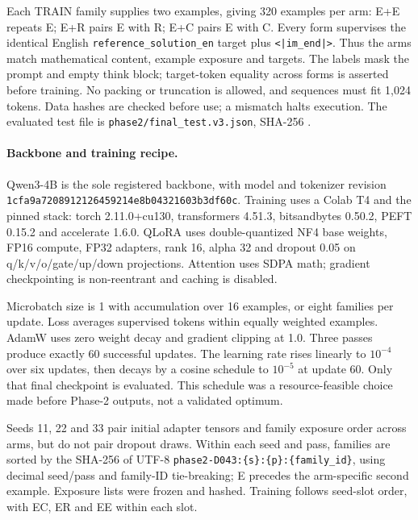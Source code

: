 Each TRAIN family supplies two examples, giving 320 examples per arm: E+E repeats E; E+R pairs E with R; E+C pairs E with C. Every form supervises the identical English \texttt{reference\_solution\_en} target plus \texttt{<|im\_end|>}. Thus the arms match mathematical content, example exposure and targets. The labels mask the prompt and empty think block; target-token equality across forms is asserted before training. No packing or truncation is allowed, and sequences must fit 1,024 tokens. Data hashes are checked before use; a mismatch halts execution. The evaluated test file is \nolinkurl{phase2/final_test.v3.json}, SHA-256 .

\paragraph{Backbone and training recipe.}
Qwen3-4B is the sole registered backbone, with model and tokenizer revision \texttt{1cfa9a7208912126459214e8b04321603b3df60c}. Training uses a Colab T4 and the pinned stack: torch 2.11.0+cu130, transformers 4.51.3, bitsandbytes 0.50.2, PEFT 0.15.2 and accelerate 1.6.0. QLoRA uses double-quantized NF4 base weights, FP16 compute, FP32 adapters, rank 16, alpha 32 and dropout 0.05 on q/k/v/o/gate/up/down projections. Attention uses SDPA math; gradient checkpointing is non-reentrant and caching is disabled.

Microbatch size is 1 with accumulation over 16 examples, or eight families per update. Loss averages supervised tokens within equally weighted examples. AdamW uses zero weight decay and gradient clipping at 1.0. Three passes produce exactly 60 successful updates. The learning rate rises linearly to $10^{-4}$ over six updates, then decays by a cosine schedule to $10^{-5}$ at update 60. Only that final checkpoint is evaluated. This schedule was a resource-feasible choice made before Phase-2 outputs, not a validated optimum.

Seeds 11, 22 and 33 pair initial adapter tensors and family exposure order across arms, but do not pair dropout draws. Within each seed and pass, families are sorted by the SHA-256 of UTF-8 \texttt{phase2-D043:\{s\}:\{p\}:\{family\_id\}}, using decimal seed/pass and family-ID tie-breaking; E precedes the arm-specific second example. Exposure lists were frozen and hashed. Training follows seed-slot order, with EC, ER and EE within each slot.

